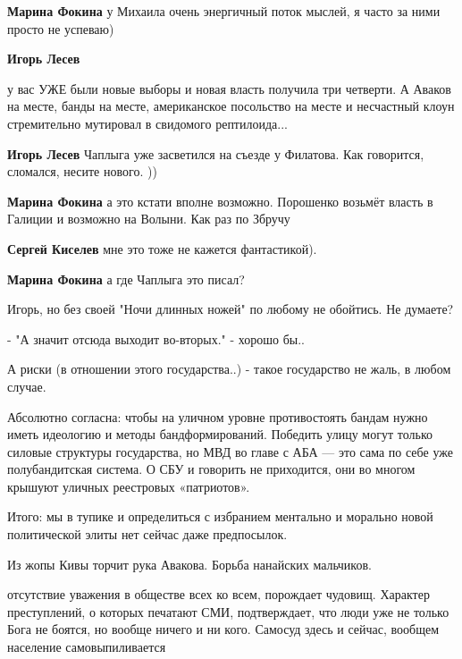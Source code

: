 \begin{itemize}
\begin{itemize}
\textbf{Марина Фокина} у Михаила очень энергичный поток мыслей, я часто за ними просто не успеваю)

\textbf{Игорь Лесев} 

у вас УЖЕ были новые выборы и новая власть получила три четверти. А Аваков на
месте, банды на месте, американское посольство на месте и несчастный клоун
стремительно мутировал в свидомого рептилоида...

\textbf{Игорь Лесев} Чаплыга уже засветился на съезде у Филатова. Как говорится, сломался, несите нового. ))

\textbf{Марина Фокина} а это кстати вполне возможно. Порошенко возьмёт власть в Галиции и возможно на Волыни. Как раз по Збручу

\textbf{Сергей Киселев} мне это тоже не кажется фантастикой).

\textbf{Марина Фокина} а где Чаплыга это писал?

Игорь, но без своей "Ночи длинных ножей" по любому не обойтись. Не думаете?
\end{itemize} %


- "А значит отсюда выходит во-вторых." - хорошо бы..

А риски (в отношении этого государства..) - такое государство не жаль, в любом
случае.


Абсолютно согласна: чтобы на уличном уровне противостоять бандам нужно иметь
идеологию и методы бандформирований. Победить улицу могут только силовые
структуры государства, но МВД во главе с АБА — это сама по себе уже
полубандитская система. О СБУ и говорить не приходится, они во многом крышуют
уличных реестровых «патриотов».

Итого: мы в тупике и определиться с избранием ментально и морально новой
политической элиты нет сейчас даже предпосылок.

Из жопы Кивы торчит рука Авакова. Борьба нанайских мальчиков.


отсутствие уважения в обществе всех ко всем, порождает чудовищ. Характер
преступлений, о которых печатают СМИ, подтверждает, что люди уже не только Бога
не боятся, но вообще ничего и ни кого. Самосуд здесь и сейчас, вообщем
население самовыпиливается


\end{itemize}
